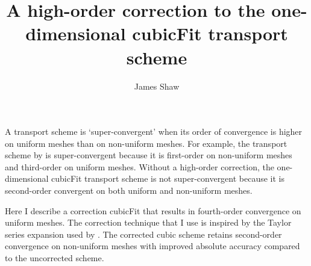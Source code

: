 \documentclass{article}
\title{A high-order correction to the one-dimensional cubicFit transport scheme}
\author{James Shaw}
\begin{document}
\maketitle

A transport scheme is `super-convergent' when its order of convergence is higher on uniform meshes than on non-uniform meshes.
For example, the transport scheme by \citet{skamarock-gassmann2011} is super-convergent because it is first-order on non-uniform meshes and third-order on uniform meshes.
Without a high-order correction, the one-dimensional cubicFit transport scheme is not super-convergent because it is second-order convergent on both uniform and non-uniform meshes.

Here I describe a correction cubicFit that results in fourth-order convergence on uniform meshes.  The correction technique that I use is inspired by the Taylor series expansion used by \citet{skamarock-gassmann2011}.
The corrected cubic scheme retains second-order convergence on non-uniform meshes with improved absolute accuracy compared to the uncorrected scheme.
\end{document}
